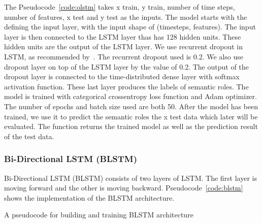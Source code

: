The Pseudocode~\ref{code:olstm} takes x train, y train, number of time steps, number of features, x test and y test as the inputs. The model starts with the defining the input layer, with the input shape of (timesteps, features). The input layer is then connected to the LSTM layer thas has 128 hidden units. These hidden units are the output of the LSTM layer. We use recurrent dropout in LSTM, as recommended by~\cite{he2017deep}. The recurrent dropout used is 0.2. We also use dropout layer on top of the LSTM layer by the value of 0.2. The output of the dropout layer is connected to the time-distributed dense layer with softmax activation function. These last layer produces the labels of semantic roles. The model is trained with categorical crossentropy loss function and Adam optimizer. The number of epochs and batch size used are both 50. After the model has been trained, we use it to predict the semantic roles the x test data which later will be evaluated. The function returns the trained model as well as the prediction result of the test data.

\subsubsection{Bi-Directional LSTM (BLSTM)}
Bi-Directional LSTM (BLSTM) consists of two layers of LSTM. The first layer is moving forward and the other is moving backward. Pseudocode~\ref{code:blstm} shows the implementation of the BLSTM architecture.

\begin{kode}
	
	
	\caption{A pseudocode for building and training BLSTM architecture}
	\label{code:blstm}
\end{kode}

